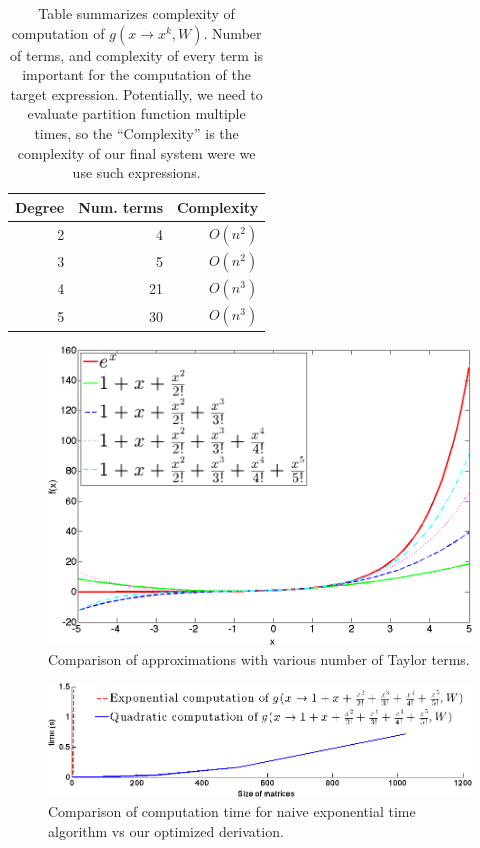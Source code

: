 \begin{table}
\tiny
\centering
\begin{tabular}{rrr}
\hline
Degree & Num. terms & Complexity \\
\hline
2 & 4 & $O(n^2)$\\
3 & 5 & $O(n^2)$\\
4 & 21 & $O(n^3)$\\
5 & 30 & $O(n^3)$\\
\hline
\end{tabular}
\caption{Table summarizes complexity of computation of $g(x \rightarrow x^k, W)$. 
Number of terms, and complexity of every term is important for the computation of the target expression.
Potentially, we need to evaluate partition function multiple times, so the ``Complexity''
is the complexity of our final system were we use such expressions.} 
\label{eval}
\end{table}

\begin{figure}[h]
\centering
\includegraphics[scale=0.2]{img/approximations.png}
\caption{Comparison of approximations with various number of Taylor terms.}
\label{approximations}
\end{figure}



\begin{figure}[h]
\centering
\includegraphics[scale=0.24]{img/time_approx.png}
\caption{Comparison of computation time for naive exponential time algorithm vs our optimized derivation.}
\label{time_approx}
\end{figure}



